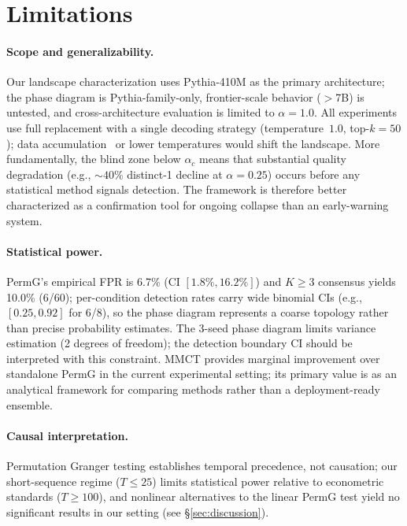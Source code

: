 \section*{Limitations}
\label{sec:limitations}

\paragraph{Scope and generalizability.}
Our landscape characterization uses Pythia-410M as the primary architecture; the phase diagram is Pythia-family-only, frontier-scale behavior (${>}$7B) is untested, and cross-architecture evaluation is limited to $\alpha{=}1.0$.
All experiments use full replacement with a single decoding strategy (temperature~$1.0$, top-$k{=}50$); data accumulation~\citep{dey2024breaking} or lower temperatures would shift the landscape.
More fundamentally, the blind zone below $\alpha_c$ means that substantial quality degradation (e.g., ${\sim}40\%$ distinct-1 decline at $\alpha{=}0.25$) occurs before any statistical method signals detection.
The framework is therefore better characterized as a confirmation tool for ongoing collapse than an early-warning system.

\paragraph{Statistical power.}
PermG's empirical FPR is 6.7\% (CI $[1.8\%, 16.2\%]$) and $K{\geq}3$ consensus yields 10.0\% (6/60); per-condition detection rates carry wide binomial CIs (e.g., $[0.25, 0.92]$ for 6/8), so the phase diagram represents a coarse topology rather than precise probability estimates.
The 3-seed phase diagram limits variance estimation (2 degrees of freedom); the detection boundary CI should be interpreted with this constraint.
MMCT provides marginal improvement over standalone PermG in the current experimental setting; its primary value is as an analytical framework for comparing methods rather than a deployment-ready ensemble.

\paragraph{Causal interpretation.}
Permutation Granger testing establishes temporal precedence, not causation; our short-sequence regime ($T{\leq}25$) limits statistical power relative to econometric standards ($T{\geq}100$), and nonlinear alternatives to the linear PermG test yield no significant results in our setting (see \S\ref{sec:discussion}).
